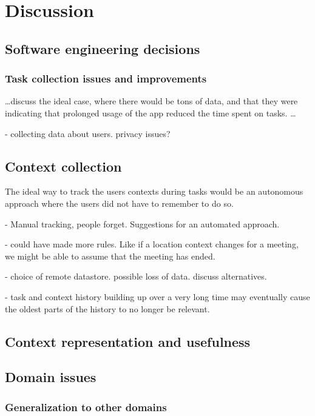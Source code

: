 \chapter{Discussion}
\label{chap:discussion}

\section{Software engineering decisions}

\subsection{Task collection issues and improvements}
\ldots discuss the ideal case, where there would be tons of data, and that they were indicating that prolonged usage of the app reduced the time spent on tasks. \ldots

- collecting data about users. privacy issues?

\section{Context collection}

The ideal way to track the users contexts during tasks would be an autonomous approach where the users did not have to remember to do so.

- Manual tracking, people forget. Suggestions for an automated approach.

- could have made more rules. Like if a location context changes for a meeting, we might be able to assume that the meeting has ended.

- choice of remote datastore. possible loss of data. discuss alternatives.

- task and context history building up over a very long time may eventually cause the oldest parts of the history to no longer be relevant.

\section{Context representation and usefulness}



\section{Domain issues}


\subsection{Generalization to other domains}